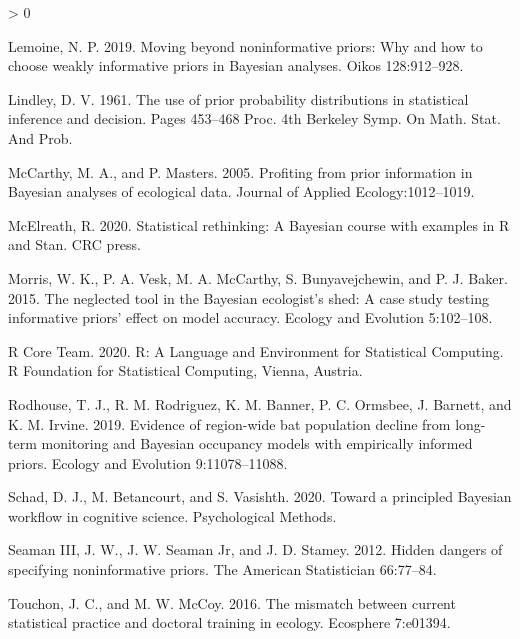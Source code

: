 \documentclass[
  12pt,
]{article}
\newlength{\cslhangindent}
\newenvironment{CSLReferences}[2] %
 {%
  \setlength{\parindent}{0pt}
  \ifodd #1 \everypar{\setlength{\hangindent}{\cslhangindent}}\ignorespaces\fi
  \ifnum #2 > 0
  \setlength{\parskip}{#2\baselineskip}
  \fi
 }%
 {}
\begin{document}
\begin{CSLReferences}{1}{0}
\leavevmode\hypertarget{ref-lemoine_moving_2019}{}%
Lemoine, N. P. 2019. Moving beyond noninformative priors: Why and how to
choose weakly informative priors in {Bayesian} analyses. Oikos
128:912--928.

\leavevmode\hypertarget{ref-lindley_use_1961}{}%
Lindley, D. V. 1961. The use of prior probability distributions in
statistical inference and decision. Pages 453--468 Proc. 4th {Berkeley}
{Symp}. On {Math}. {Stat}. And {Prob}.

\leavevmode\hypertarget{ref-mccarthy_profiting_2005}{}%
McCarthy, M. A., and P. Masters. 2005. Profiting from prior information
in {Bayesian} analyses of ecological data. Journal of Applied
Ecology:1012--1019.

\leavevmode\hypertarget{ref-mcelreath_statistical_2020}{}%
McElreath, R. 2020. Statistical rethinking: {A} {Bayesian} course with
examples in {R} and {Stan}. CRC press.

\leavevmode\hypertarget{ref-morris_neglected_2015}{}%
Morris, W. K., P. A. Vesk, M. A. McCarthy, S. Bunyavejchewin, and P. J.
Baker. 2015. The neglected tool in the {Bayesian} ecologist's shed: A
case study testing informative priors' effect on model accuracy. Ecology
and Evolution 5:102--108.

\leavevmode\hypertarget{ref-r_core_team_r_2020}{}%
R Core Team. 2020. R: {A} {Language} and {Environment} for {Statistical}
{Computing}. R Foundation for Statistical Computing, Vienna, Austria.

\leavevmode\hypertarget{ref-rodhouse_evidence_2019}{}%
Rodhouse, T. J., R. M. Rodriguez, K. M. Banner, P. C. Ormsbee, J.
Barnett, and K. M. Irvine. 2019. Evidence of region-wide bat population
decline from long-term monitoring and {Bayesian} occupancy models with
empirically informed priors. Ecology and Evolution 9:11078--11088.

\leavevmode\hypertarget{ref-schad_toward_2020}{}%
Schad, D. J., M. Betancourt, and S. Vasishth. 2020. Toward a principled
{Bayesian} workflow in cognitive science. Psychological Methods.

\leavevmode\hypertarget{ref-seaman_iii_hidden_2012}{}%
Seaman III, J. W., J. W. Seaman Jr, and J. D. Stamey. 2012. Hidden
dangers of specifying noninformative priors. The American Statistician
66:77--84.

\leavevmode\hypertarget{ref-touchon_mismatch_2016}{}%
Touchon, J. C., and M. W. McCoy. 2016. The mismatch between current
statistical practice and doctoral training in ecology. Ecosphere
7:e01394.


\end{CSLReferences}
\end{document}
